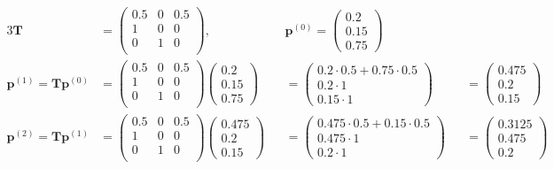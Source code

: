 \documentclass[a4paper, 12pt]{report}
\newcommand{\T}{\bm{T}}
\begin{document}
\begin{alignat*}{3}
    \T &= 
    \begin{pmatrix}
        0.5 & 0 & 0.5 \\
        1 & 0 & 0 \\
        0 & 1 & 0 \\
    \end{pmatrix}, &&\bm{p}^{(0)} = 
    \begin{pmatrix}
        0.2 \\
        0.15 \\
        0.75
    \end{pmatrix} &&\\
    \bm{p}^{(1)} = \T\bm{p}^{(0)} &= 
    \begin{pmatrix}
        0.5 & 0 & 0.5 \\
        1 & 0 & 0 \\
        0 & 1 & 0 \\
    \end{pmatrix}
    \begin{pmatrix}
        0.2 \\
        0.15 \\
        0.75
    \end{pmatrix} &&= 
    \begin{pmatrix}
        0.2 \cdot 0.5 + 0.75 \cdot 0.5 \\
        0.2 \cdot 1 \\
        0.15 \cdot 1
    \end{pmatrix} &&= 
    \begin{pmatrix}
        0.475 \\
        0.2 \\
        0.15
    \end{pmatrix} \\
    \bm{p}^{(2)} = \T\bm{p}^{(1)} &= 
    \begin{pmatrix}
        0.5 & 0 & 0.5 \\
        1 & 0 & 0 \\
        0 & 1 & 0 \\
    \end{pmatrix}
    \begin{pmatrix}
        0.475 \\
        0.2 \\
        0.15
    \end{pmatrix} &&= 
    \begin{pmatrix}
        0.475 \cdot 0.5 + 0.15 \cdot 0.5 \\
        0.475 \cdot 1 \\
        0.2 \cdot 1
    \end{pmatrix} &&= 
    \begin{pmatrix}
        0.3125 \\
        0.475 \\
        0.2
    \end{pmatrix}
\end{alignat*}
\end{document}
